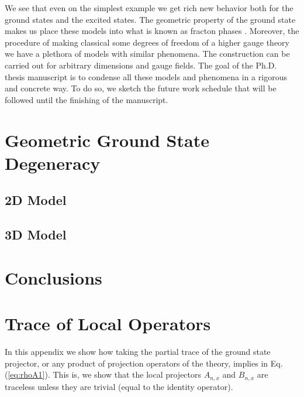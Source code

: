 \documentclass[%
nofootinbib,
 amsmath,amssymb,
aps,
]{revtex4-1}
\theoremstyle{plain}%
\theoremstyle{definition}
\theoremstyle{remark}
\begin{document}
We see that even on the simplest example we get rich new behavior both for the ground states and the excited states. The geometric property of the ground state makes us place these models into what is known as fracton phases \cite{chamon05,rahul18}. Moreover, the procedure of making classical some degrees of freedom  of a higher gauge theory we have a plethora of models with similar phenomena. The construction can be carried out for arbitrary dimensions and gauge fields. The goal of the Ph.D. thesis manuscript is to condense all these models and phenomena in a rigorous and concrete way. To do so, we sketch the future work schedule that will be followed until the finishing of the manuscript.

 
\section{Geometric Ground State Degeneracy}\label{sec:G-GSD}
\subsection{2D Model}
\subsection{3D Model}

\section{Conclusions}\label{sec:Remarks}

\appendix






\section{Trace of Local Operators}\label{sec:app2}
In this appendix we show how taking the partial trace of the ground state projector, or any product of projection operators of the theory, implies in Eq.(\ref{eq:rhoA1}). This is, we show that the local projectors \(A_{n,x}\) and \(B_{n,x}\) are traceless unless they are trivial (equal to the identity operator).
\end{document}
